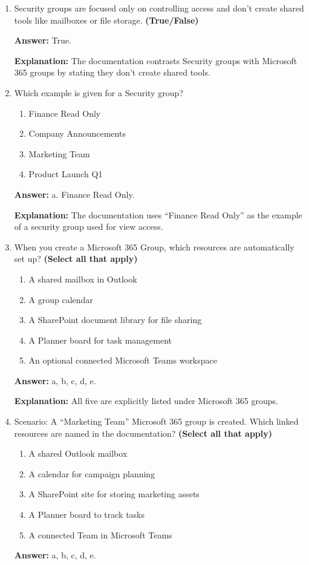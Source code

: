 \documentclass[10pt]{article}
\begin{document}
\begin{enumerate}[leftmargin=*]
\textbf{Explanation:} All five are described in separate paragraphs.

\item Security groups are focused only on controlling access and don’t create shared tools like mailboxes or file storage. \textbf{(True/False)}

\textbf{Answer:} True.

\textbf{Explanation:} The documentation contrasts Security groups with Microsoft 365 groups by stating they don’t create shared tools.

\item Which example is given for a Security group?
\begin{enumerate}[label=\alph*., leftmargin=1.5em]
\item Finance Read Only
\item Company Announcements
\item Marketing Team
\item Product Launch Q1
\end{enumerate}
\textbf{Answer:} a. Finance Read Only.

\textbf{Explanation:} The documentation uses ``Finance Read Only'' as the example of a security group used for view access.

\item When you create a Microsoft 365 Group, which resources are automatically set up? \textbf{(Select all that apply)}
\begin{enumerate}[label=\alph*., leftmargin=1.5em]
\item A shared mailbox in Outlook
\item A group calendar
\item A SharePoint document library for file sharing
\item A Planner board for task management
\item An optional connected Microsoft Teams workspace
\end{enumerate}
\textbf{Answer:} a, b, c, d, e.

\textbf{Explanation:} All five are explicitly listed under Microsoft 365 groups.

\item Scenario: A ``Marketing Team'' Microsoft 365 group is created. Which linked resources are named in the documentation? \textbf{(Select all that apply)}
\begin{enumerate}[label=\alph*., leftmargin=1.5em]
\item A shared Outlook mailbox
\item A calendar for campaign planning
\item A SharePoint site for storing marketing assets
\item A Planner board to track tasks
\item A connected Team in Microsoft Teams
\end{enumerate}
\textbf{Answer:} a, b, c, d, e.


\end{enumerate}
\end{document}
